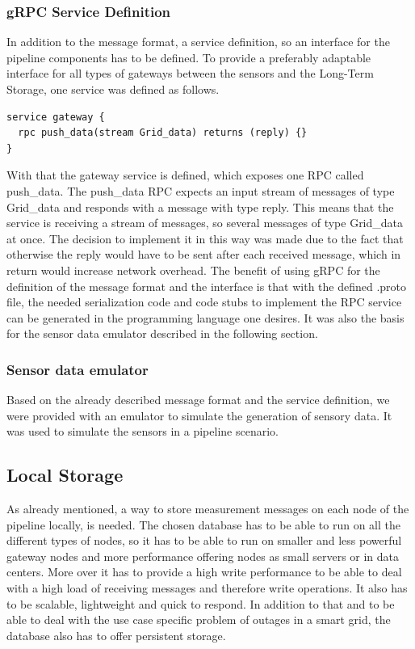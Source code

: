 \subsubsection{gRPC Service Definition}
In addition to the message format, a service definition, so an interface for the pipeline components has to be defined. To provide a preferably adaptable interface for all types of gateways between the sensors and the Long-Term Storage, one service was defined as follows.
\begin{lstlisting}
service gateway {
  rpc push_data(stream Grid_data) returns (reply) {}
}
\end{lstlisting}
With that the gateway service is defined, which exposes one RPC called push\_data. The push\_data RPC expects an input stream of messages of type Grid\_data and responds with a message with type reply. This means that the service is receiving a stream of messages, so several messages of type Grid\_data at once. The decision to implement it in this way was made due to the fact that otherwise the reply would have to be sent after each received message, which in return would increase network overhead. The benefit of using gRPC for the definition of the message format and the interface is that with the defined .proto file, the needed serialization code and code stubs to implement the RPC service can be generated in the programming language one desires. It was also the basis for the sensor data emulator described in the following section.

\subsubsection{Sensor data emulator}
Based on the already described message format and the service definition, we were provided with an emulator to simulate the generation of sensory data. It was used to simulate the sensors in a pipeline scenario.

\subsection{Local Storage}
As already mentioned, a way to store measurement messages on each node of the pipeline locally, is needed. The chosen database has to be able to run on all the different types of nodes, so it has to be able to run on smaller and less powerful gateway nodes and more performance offering nodes as small servers or in data centers. More over it has to provide a high write performance to be able to deal with a high load of receiving messages and therefore write operations. It also has to be scalable, lightweight and quick to respond. In addition to that and to be able to deal with the use case specific problem of outages in a smart grid, the database also has to offer persistent storage.  
